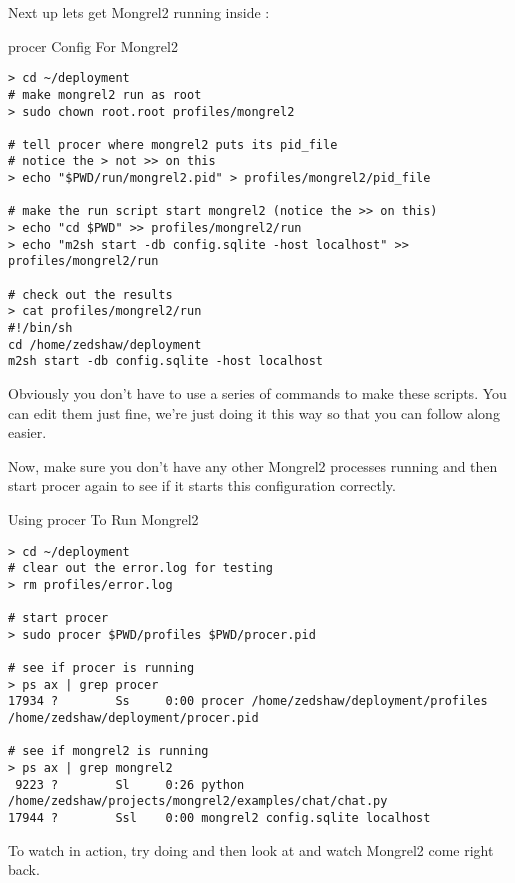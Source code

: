 Next up lets get Mongrel2 running inside :

\begin{code}{procer Config For Mongrel2}
\begin{Verbatim}
> cd ~/deployment
# make mongrel2 run as root
> sudo chown root.root profiles/mongrel2

# tell procer where mongrel2 puts its pid_file
# notice the > not >> on this
> echo "$PWD/run/mongrel2.pid" > profiles/mongrel2/pid_file

# make the run script start mongrel2 (notice the >> on this)
> echo "cd $PWD" >> profiles/mongrel2/run
> echo "m2sh start -db config.sqlite -host localhost" >> profiles/mongrel2/run

# check out the results
> cat profiles/mongrel2/run
#!/bin/sh
cd /home/zedshaw/deployment
m2sh start -db config.sqlite -host localhost
\end{Verbatim}
\end{code}

Obviously you don't have to use a series of  commands to
make these scripts.  You can edit them just fine, we're just doing it
this way so that you can follow along easier.

Now, make sure you don't have any other Mongrel2 processes running
and then start procer again to see if it starts this configuration
correctly.


\begin{code}{Using procer To Run Mongrel2}
\begin{Verbatim}
> cd ~/deployment
# clear out the error.log for testing
> rm profiles/error.log 

# start procer 
> sudo procer $PWD/profiles $PWD/procer.pid

# see if procer is running
> ps ax | grep procer
17934 ?        Ss     0:00 procer /home/zedshaw/deployment/profiles /home/zedshaw/deployment/procer.pid

# see if mongrel2 is running
> ps ax | grep mongrel2
 9223 ?        Sl     0:26 python /home/zedshaw/projects/mongrel2/examples/chat/chat.py
17944 ?        Ssl    0:00 mongrel2 config.sqlite localhost

\end{Verbatim}
\end{code}

To watch  in action, try doing  and then look at  and watch
Mongrel2 come right back.



